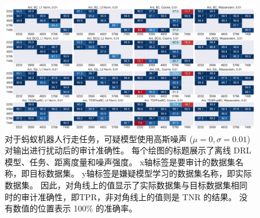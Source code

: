     
\begin{figure}[!ht]
    \includegraphics[width=\hsize]{figure/orl_auditor/overall_sac_ant-v2_20230201160818087.pdf}
    \caption{
    对于蚂蚁机器人行走任务，可疑模型使用高斯噪声 ($\mu=0, \sigma=0.01$) 对输出进行扰动后的审计准确性。
    每个绘图的标题展示了离线 DRL 模型、任务、距离度量和噪声强度。
    x轴标签是要审计的数据集名称，即目标数据集。
    y轴标签是嫌疑模型学习的数据集名称，即实际数据集。
    因此，对角线上的值显示了实际数据集与目标数据集相同时的审计准确性，即TPR，非对角线上的值则是 TNR 的结果。
    没有数值的位置表示 100\% 的准确率。
    }
    \label{fig:robustness 0.01 on ant}
    \end{figure}
    
